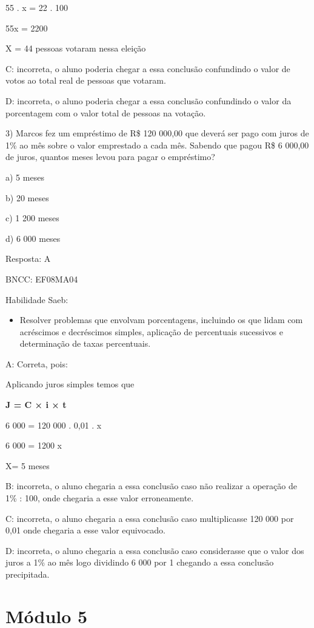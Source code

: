 55 . x = 22 . 100

55x = 2200

X = 44 pessoas votaram nessa eleição

C: incorreta, o aluno poderia chegar a essa conclusão confundindo o
valor de votos ao total real de pessoas que votaram.

D: incorreta, o aluno poderia chegar a essa conclusão confundindo o
valor da porcentagem com o valor total de pessoas na votação.

3) Marcos fez um empréstimo de R\$ 120 000,00 que deverá ser pago com
juros de 1\% ao mês sobre o valor emprestado a cada mês. Sabendo que
pagou R\$ 6 000,00 de juros, quantos meses levou para pagar o
empréstimo?

a) 5 meses

b) 20 meses

c) 1 200 meses

d) 6 000 meses

Resposta: A

BNCC: EF08MA04

Habilidade Saeb:

\begin{itemize}
\tightlist
\item
  Resolver problemas que envolvam porcentagens, incluindo os que lidam
  com acréscimos e decréscimos simples, aplicação de percentuais
  sucessivos e determinação de taxas percentuais.
\end{itemize}

A: Correta, pois:

Aplicando juros simples temos que

\textbf{J = C × i × t}

6 000 = 120 000 . 0,01 . x

6 000 = 1200 x

X= 5 meses

B: incorreta, o aluno chegaria a essa conclusão caso não realizar a
operação de 1\% : 100, onde chegaria a esse valor erroneamente.

C: incorreta, o aluno chegaria a essa conclusão caso multiplicasse 120
000 por 0,01 onde chegaria a esse valor equivocado.

D: incorreta, o aluno chegaria a essa conclusão caso considerasse que o
valor dos juros a 1\% ao mês logo dividindo 6 000 por 1 chegando a essa
conclusão precipitada.

\hypertarget{muxf3dulo-5}{%
\section{Módulo 5}\label{muxf3dulo-5}}

